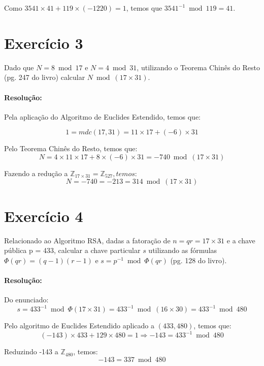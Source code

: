 \documentclass[a4paper,11pt]{article} %
\begin{document}
Como $ 3541\times41 + 119\times(-1220) = 1 $, temos que $ 3541^{-1} \bmod 119 = 41 $.


\section{Exercício 3}
\mbox{}

Dado que $ N = 8 \bmod 17  $ e $ N = 4 \bmod 31 $, utilizando o Teorema Chinês do Resto (pg. 247 do livro) calcular $ N \bmod (17 \times 31) $.

\paragraph{Resolução:}
Pela aplicação do Algoritmo de Euclides Estendido, temos que:

$$ 1 = mdc(17, 31) = 11 \times 17 + (-6) \times 31 $$

Pelo Teorema Chinês do Resto, temos que:
$$ N = 4 \times 11 \times 17 + 8 \times (-6) \times 31 = -740 \bmod (17 \times 31) $$ 

Fazendo a redução a $ \mathbb{Z}_{17 \times 31} = \mathbb{Z}_{527}, temos:$
$$ N = -740 = -213 = 314 \bmod (17 \times 31) $$



\section{Exercício 4}
\mbox{}


Relacionado ao Algoritmo RSA, dadas a fatoração de $ n = qr = 17 \times 31 $ e a chave pública p = 433, calcular a chave particular $ s $ utilizando as fórmulas $ \Phi (qr) = (q - 1)(r - 1) $ e $ s = p^{-1} \bmod \Phi(qr) $ (pg. 128 do livro).

\paragraph{Resolução:}
Do enunciado: $$ s = 433^{-1} \bmod \Phi(17 \times 31) = 433^{-1} \bmod (16 \times 30) = 433^{-1} \bmod 480 $$

Pelo algoritmo de Euclides Estendido aplicado a $ (433, 480) $, temos que:
$$ (-143) \times 433 + 129 \times 480 = 1 \Rightarrow -143 = 433^{-1} \bmod 480 $$

Reduzindo -143 a $ \mathbb{Z}_{480} $, temos:
$$ -143 = 337 \bmod 480 $$



\mbox{}
\end{document}
